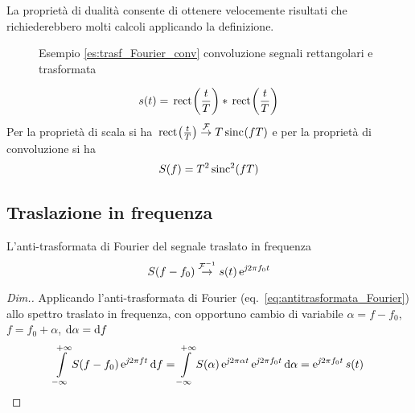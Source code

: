\begin{nota}
La proprietà di dualità consente di ottenere velocemente risultati che richiederebbero molti calcoli applicando la definizione.
\end{nota}

\begin{esempio}\label{es:trasf_Fourier_conv}

\begin{figure}[!h]
\centering
{}\qquad
{}
\caption{Esempio \ref{es:trasf_Fourier_conv} convoluzione segnali rettangolari e trasformata}
\end{figure}

\[s(t)=\,{\operatorname{rect}}^{}\!\left({\frac{t}{T}}\right)\ast\,{\operatorname{rect}}^{}\!\left({\frac{t}{T}}\right)\]
Per la proprietà di scala si ha $\,{\operatorname{rect}}^{}\!\left({\frac{t}{T}}\right)\overset{\operatorname{\mathcal{F}}}{\to}T\,{\operatorname{sinc}}^{}\!\left({f T}\right)$ e per la proprietà di convoluzione si ha
\[S(f)=T^2\operatorname{sinc}^2(f T)\]
\end{esempio}

\subsection{Traslazione in frequenza}
L'anti-trasformata di Fourier del segnale traslato in frequenza
\begin{equation}
S(f-f_0)\overset{\operatorname{\mathcal{F}}^{-1}}{\rightarrow}s(t)\operatorname{e}^{\operatorname{\mathit{j}\!} 2\pi f_0 t}
\end{equation}

\begin{proof}[Dim.]
Applicando l'anti-trasformata di Fourier (eq.~\ref{eq:antitrasformata_Fourier}) allo spettro traslato in frequenza, con opportuno cambio di variabile $\alpha=f-f_0$, $f=f_0+\alpha$, $\mathop{}\!\mathrm{d}\alpha=\mathop{}\!\mathrm{d} f$
\[\int\limits_{-\infty}^{+\infty}{S(f-f_0)\operatorname{e}^{\operatorname{\mathit{j}\!} 2\pi f t}}{\,\mathop{}\!\mathrm{d}{f}}=
\int\limits_{-\infty}^{+\infty}{S(\alpha)\operatorname{e}^{\operatorname{\mathit{j}\!} 2\pi\alpha t}\operatorname{e}^{\operatorname{\mathit{j}\!} 2\pi f_0 t}}{\,\mathop{}\!\mathrm{d}{\alpha}}=\operatorname{e}^{\operatorname{\mathit{j}\!} 2\pi f_0 t} s(t)\qedhere\]
\end{proof}

